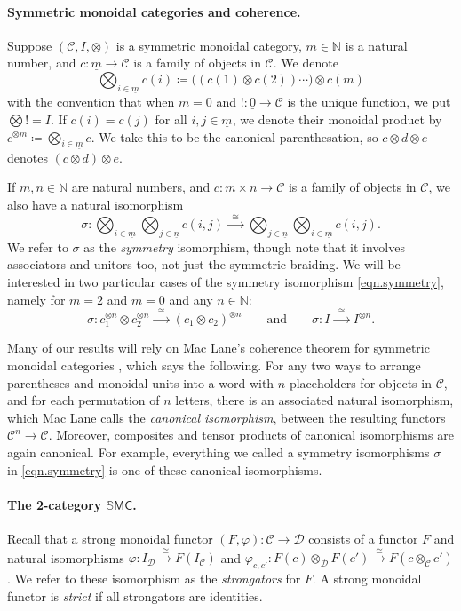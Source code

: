\documentclass[11pt, oneside, article]{memoir}
\theoremstyle{plain}
\theoremstyle{definition}
\theoremstyle{remark}
\newcommand{\ord}[1]{\underline{#1}}%
\newcommand{\cat}[1]{\mathcal{#1}}%
\newcommand{\Cat}[1]{{\mathsf{#1}}}%
\newcommand{\tpow}[1]{^{\otimes #1}}
\newcommand{\nn}{\mathbb{N}}
\newcommand{\To}[1]{\xrightarrow{#1}}
\newcommand{\Too}[1]{\To{\;\;#1\;\;}}
\newcommand{\qqand}{\qquad\text{and}\qquad}
\begin{document}
\paragraph{Symmetric monoidal categories and coherence.}
Suppose $(\cat{C}, I, \otimes)$ is a symmetric monoidal category, $m\in\nn$ is a natural number, and $c\colon\ord{m}\to\cat{C}$ is a family of objects in $\cat{C}$. We denote
\[
	\bigotimes_{i\in\ord{m}}c(i)\coloneqq
  \big((c(1)\otimes c(2))\cdots\big)\otimes c(m)
\]
with the convention that when $m=0$ and $!\colon\ord{0}\to \cat{C}$ is the unique function, we put $\bigotimes != I$. If $c(i)=c(j)$ for all $i,j\in\ord{m}$, we denote their monoidal product by $c\tpow{m}\coloneqq\bigotimes_{i\in\ord{m}}c$. We take this to be the canonical parenthesation, so $c\otimes d\otimes e$ denotes $(c\otimes d)\otimes e$. 

If $m,n\in\nn$ are natural numbers, and $c\colon \ord{m}\times \ord{n}\to\cat{C}$ is a family of objects in $\cat{C}$, we also have a natural isomorphism
\begin{equation}\label{eqn.symmetry}
\sigma\colon
\bigotimes_{i\in\ord{m}}\bigotimes_{j\in\ord{n}}c(i,j)\Too{\cong}
\bigotimes_{j\in\ord{n}}\bigotimes_{i\in\ord{m}}c(i,j).
\end{equation}
We refer to $\sigma$ as the \emph{symmetry} isomorphism, though note that it involves associators and unitors too, not just the symmetric braiding. We will be interested in two particular cases of the symmetry isomorphism \cref{eqn.symmetry}, namely for $m=2$ and $m=0$ and any $n\in\nn$:
\[\sigma\colon c_1\tpow{n}\otimes c_2\tpow{n}\Too{\cong}(c_1\otimes c_2)\tpow{n}
\qqand
\sigma\colon I\Too{\cong} I\tpow{n}.
\]

Many of our results will rely on Mac Lane's coherence theorem for symmetric monoidal categories \cite[Theorem XI.1]{MacLane:1998a}, which says the following. For any two ways to arrange parentheses and monoidal units into a word with $n$ placeholders for objects in $\cat{C}$, and for each permutation of $n$ letters, there is an associated natural isomorphism, which Mac Lane calls the \emph{canonical isomorphism}, between the resulting functors $\cat{C}^n\to\cat{C}$. Moreover, composites and tensor products of canonical isomorphisms are again canonical. For example, everything we called a symmetry isomorphisms $\sigma$ in \cref{eqn.symmetry} is one of these canonical isomorphisms.


\paragraph{The 2-category $\mathbb{S}\Cat{MC}$.}
Recall that a strong monoidal functor $(F,\varphi)\colon\cat{C}\to\cat{D}$ consists of a functor $F$ and natural isomorphisms $\varphi\colon I_{\cat{D}}\To{\cong} F(I_{\cat{C}})$ and $\varphi_{c,c'}\colon F(c)\otimes_{\cat{D}} F(c')\To{\cong} F(c\otimes_{\cat{C}} c')$. We refer to these isomorphism as the \emph{strongators} for $F$. A strong monoidal functor is \emph{strict} if all strongators are identities.
\end{document}
